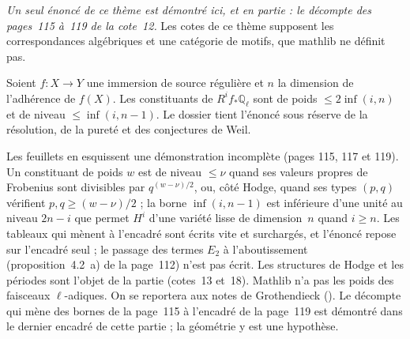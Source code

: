 \noindent\textit{Un seul énoncé de ce thème est démontré ici, et en partie : le décompte des pages~115 à~119 de la cote~12.} Les cotes de ce thème supposent les correspondances algébriques et une catégorie de motifs, que mathlib ne définit pas.\par\smallskip{}\medskip

\begin{encadre}
\begin{theoreme*}\nonverifie
Soient $f : X \to Y$ une immersion de source régulière et $n$ la dimension de l'adhérence de $f(X)$. Les constituants de $R^i f_*\mathbb Q_\ell$ sont de poids $\leq 2\inf(i, n)$ et de niveau $\leq \inf(i, n-1)$. Le dossier tient l'énoncé sous réserve de la résolution, de la pureté et des conjectures de Weil.
\end{theoreme*}
\end{encadre}
{\small Les feuillets en esquissent une démonstration incomplète (pages 115, 117 et 119). Un constituant de poids $w$ est de niveau $\leq \nu$ quand ses valeurs propres de Frobenius sont divisibles par $q^{(w-\nu)/2}$, ou, côté Hodge, quand ses types $(p, q)$ vérifient $p, q \geq (w - \nu)/2$ ; la borne $\inf(i, n-1)$ est inférieure d'une unité au niveau $2n - i$ que permet $H^i$ d'une variété lisse de dimension~$n$ quand $i \geq n$. Les tableaux qui mènent à l'encadré sont écrits vite et surchargés, et l'énoncé repose sur l'encadré seul ; le passage des termes $E_2$ à l'aboutissement (proposition~4.2~a) de la page~112) n'est pas écrit. Les structures de Hodge et les périodes sont l'objet de la partie  (cotes~13 et~18). Mathlib n'a pas les poids des faisceaux $\ell$-adiques. On se reportera aux notes de Grothendieck (). Le décompte qui mène des bornes de la page~115 à l'encadré de la page~119 est démontré dans le dernier encadré de cette partie ; la géométrie y est une hypothèse.\par}

